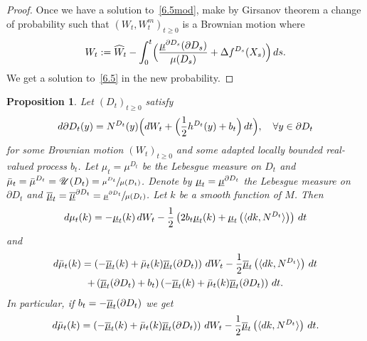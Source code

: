 \documentclass[JEP,XML,SOM,Unicode,NoFloatCountersInSection,published]{cedram}
\theoremstyle{plain}
\newtheorem{prop}[thm]{Proposition}
\theoremstyle{definition}
\newcommand{\SU}{{\mathscr U}}
\newcommand{\usm}{{\underline{\smash{\mu}}}}
\newcommand{\usbm}{{\underline{\smash{\overline\mu}}}}
\let\di\displaystyle
\let\f\frac
\begin{document}
\begin{proof}
Once we have a solution to~\eqref{6.5mod}, make by Girsanov theorem a change of probability such that $(W_t,W_t^m)_{t\geq 0}$ is a Brownian motion where
\begin{equation}
W_t:=\widehat W_t-\int_0^t \Bigl(\f{\usm^{\partial D_s}(\partial D_s)}{\mu(D_s)}+\Delta f^{D_s}(X_s) \Bigr)\, ds.
\end{equation}
We get a solution to~\eqref{6.5} in the new probability.
\end{proof}

\begin{prop}
\label{P4.5}
Let $(D_t)_{t\geq 0}$ satisfy
\begin{equation}
d\partial D_t(y)=N^{D_t}(y) \Bigl(dW_t+ \Bigl(\f12 h^{D_t}(y)+b_t \Bigr)\,dt \Bigr),\quad \forall y\in \partial D_t
\end{equation}
for some Brownian motion $(W_t)_{t\geq 0}$ and some adapted locally bounded real-valued process $b_t$.
Let $\mu_t=\mu^{D_t}$ be the Lebesgue measure on $D_t$ and $\di \bar\mu_t=\bar \mu^{D_t}=\SU(D_{t})=\sfrac{\mu^{D_t}}{\mu(D_t)}$. Denote by $\usm_t=\usm^{\partial D_t}$ the Lebesgue measure on $\partial D_t$ and $\di \usbm_t=\usbm^{\partial D_t}=\sfrac{\usm^{\partial D_t}}{\mu(D_t)}$.
Let $k$ be a smooth function of $M$. Then
\begin{equation}
\label{4.9.1}
d\mu_t(k)=-{\usm}_t(k)\,dW_t-\f12 \left(2b_t\usm_t(k)+{\usm}_t\left(\langle dk,N^{D_t}\rangle \right)\right)\,dt
\end{equation}
and
\begin{multline}
\label{4.9.2}
d\bar\mu_t(k)=\left(-\usbm_t(k)+\bar\mu_t(k)\usbm_t(\partial D_t)\right)\,dW_t-\f12 \usbm_t\left(\langle dk,N^{D_t}\rangle \right)\,dt\\
+\left(\usbm_t(\partial D_t)+b_t\right)\left(-\usbm_t(k)+\bar\mu_t(k)\usbm_t(\partial D_t)\right)\,dt.
\end{multline}
In particular, if $b_t=-\usbm_t(\partial D_t)$ we get
\begin{equation}
\label{4.9}
d\bar\mu_t(k)=\left(-\usbm_t(k)+\bar\mu_t(k)\usbm_t(\partial D_t)\right)\,dW_t-\f12 \usbm_t\left(\langle dk,N^{D_t}\rangle \right)\,dt.
\end{equation}
\end{prop}
\end{document}
